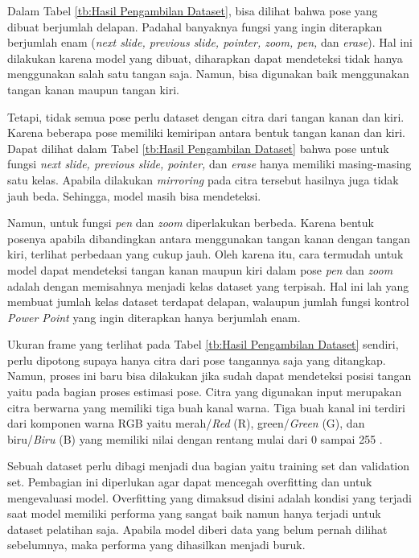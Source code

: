 Dalam Tabel \ref{tb:Hasil Pengambilan Dataset}, bisa dilihat bahwa pose yang dibuat berjumlah delapan. Padahal banyaknya fungsi yang ingin diterapkan berjumlah enam (\emph{next slide, previous slide, pointer, zoom, pen,} dan \emph{erase}). Hal ini dilakukan karena model yang dibuat, diharapkan dapat mendeteksi tidak hanya menggunakan salah satu tangan saja. Namun, bisa digunakan baik menggunakan tangan kanan maupun tangan kiri. 

Tetapi, tidak semua pose perlu dataset dengan citra dari tangan kanan dan kiri. Karena beberapa pose memiliki kemiripan antara bentuk tangan kanan dan kiri. Dapat dilihat dalam Tabel \ref{tb:Hasil Pengambilan Dataset} bahwa pose untuk fungsi \emph{next slide, previous slide, pointer,} dan \emph{erase} hanya memiliki masing-masing satu kelas. Apabila dilakukan \emph{mirroring} pada citra tersebut hasilnya juga tidak jauh beda. Sehingga, model masih bisa mendeteksi.

Namun, untuk fungsi \emph{pen} dan \emph{zoom} diperlakukan berbeda. Karena bentuk posenya apabila dibandingkan antara menggunakan tangan kanan dengan tangan kiri, terlihat perbedaan yang cukup jauh. Oleh karena itu, cara termudah untuk model dapat mendeteksi tangan kanan maupun kiri dalam pose \emph{pen} dan \emph{zoom} adalah dengan memisahnya menjadi kelas dataset yang terpisah. Hal ini lah yang membuat jumlah kelas dataset terdapat delapan, walaupun jumlah fungsi kontrol \emph{Power Point} yang ingin diterapkan hanya berjumlah enam.

Ukuran frame yang terlihat pada Tabel \ref{tb:Hasil Pengambilan Dataset} sendiri, perlu dipotong supaya hanya citra dari pose tangannya saja yang ditangkap. Namun, proses ini baru bisa dilakukan jika sudah dapat mendeteksi posisi tangan yaitu pada bagian proses estimasi pose. Citra yang digunakan input merupakan citra berwarna yang memiliki tiga buah kanal warna. Tiga buah kanal ini terdiri dari komponen warna RGB yaitu merah/\emph{Red} (R), green/\emph{Green} (G), dan biru/\emph{Biru} (B) yang memiliki nilai dengan rentang mulai dari 0 sampai 255 \parencite{PriyantoHidayatullah}. 

Sebuah dataset perlu dibagi menjadi dua bagian yaitu training set dan validation set. Pembagian ini diperlukan agar dapat mencegah overfitting dan untuk mengevaluasi model. Overfitting yang dimaksud disini adalah kondisi yang terjadi saat model memiliki performa yang sangat baik namun hanya terjadi untuk dataset pelatihan saja. Apabila model diberi data yang belum pernah dilihat sebelumnya, maka performa yang dihasilkan menjadi buruk.

